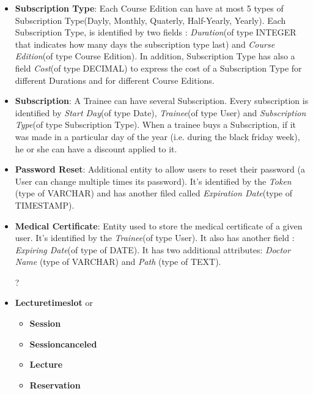 \begin{itemize}
    	\item \textbf{Subscription Type}: Each Course Edition can have at most 5 types of Subscription Type(Dayly, Monthly, Quaterly, Half-Yearly, Yearly). Each Subscription Type, is identified by two fields : \textit{Duration}(of type INTEGER that indicates how many days the subscription type last) and \textit{Course Edition}(of type Course Edition). In addition, Subscription Type has also a field \textit{Cost}(of type DECIMAL) to express the cost of a Subscription Type for different Durations and for different Course Editions.
    	
    	\item \textbf{Subscription}: A Trainee can have several Subscription. Every subscription is identified by \textit{Start Day}(of type Date), \textit{Trainee}(of type User) and \textit{Subscription Type}(of type Subscription Type). When a trainee buys a Subscription, if it was made in a particular day of the year (i.e. during the black friday week), he or she can have a discount applied to it.
    	
    	\item \textbf{Password Reset}: Additional entity to allow users to reset their password (a User can change multiple times its password). It's identified by the \textit{Token} (type of VARCHAR) and has another filed called \textit{Expiration Date}(type of TIMESTAMP).
        
        \item \textbf{Medical Certificate}: Entity used to store the medical certificate of a given user. It's identified by the \textit{Trainee}(of type User). It also has another field : \textit{Expiring Date}(of type of DATE). It has two additional attributes: \textit{Doctor Name} (type of VARCHAR) and \textit{Path} (type of TEXT).

    	\color{red}
    	\item[?]
    	
    	\item \textbf{Lecture\textunderscore time\textunderscore slot} or
		\begin{itemize}
    	    \item \textbf{Session}
		    \item \textbf{Session\textunderscore canceled}
		    \item \textbf{Lecture}
		    \item \textbf{Reservation}
    	\end{itemize}
		\color{black}
	
    \end{itemize}